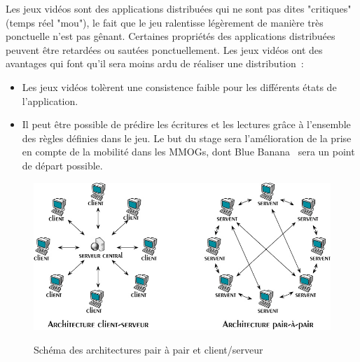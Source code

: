 	\par Les jeux vidéos sont des applications distribuées qui ne sont pas dites "critiques" (temps réel "mou"), le fait que le jeu ralentisse légèrement de manière très ponctuelle n'est pas gênant. Certaines propriétés des applications distribuées peuvent être retardées ou sautées ponctuellement. Les jeux vidéos ont des avantages qui font qu'il sera moins ardu de réaliser une distribution~\cite{1267692}:
	\begin{itemize}
		\renewcommand{\labelitemi}{$\bullet$}
		\item Les jeux vidéos tolèrent une consistence faible pour les différents états de l'application.
		\item Il peut être possible de prédire les écritures et les lectures grâce à l'ensemble des règles définies dans le jeu. Le but du stage sera l'amélioration de la prise en compte de la mobilité dans les MMOGs, dont Blue Banana~\cite{191} sera un point de départ possible.
	\end{itemize}
	\vspace{1cm}
	\begin{figure}[!h]
	\centering
	\includegraphics[scale=0.5]{../Images/p2p-85145.png}\\
	\caption{Schéma des architectures pair à pair et client/serveur}
	\label{P2P/ClServ}
	\end{figure} 
\newpage
